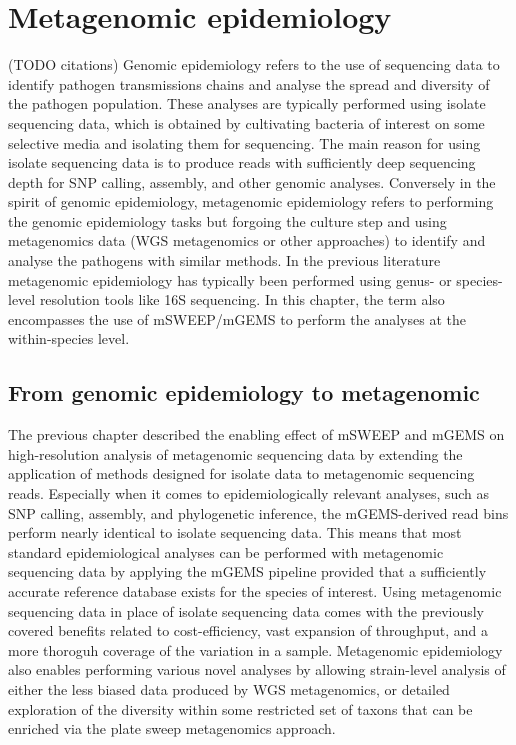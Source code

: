 \documentclass[officiallayout]{tktla}
\begin{document}
\chapter{Metagenomic epidemiology}
\label{section:metagenomic-epidemiology}

(TODO citations) Genomic epidemiology refers to the use of sequencing
data to identify pathogen transmissions chains and analyse the spread
and diversity of the pathogen population. These analyses are typically
performed using isolate sequencing data, which is obtained by
cultivating bacteria of interest on some selective media and isolating
them for sequencing. The main reason for using isolate sequencing data
is to produce reads with sufficiently deep sequencing depth for SNP
calling, assembly, and other genomic analyses. Conversely in the
spirit of genomic epidemiology, metagenomic epidemiology refers to
performing the genomic epidemiology tasks but forgoing the culture
step and using metagenomics data (WGS metagenomics or other
approaches) to identify and analyse the pathogens with similar
methods. In the previous literature metagenomic epidemiology has
typically been performed using genus- or species-level resolution
tools like 16S sequencing. In this chapter, the term also encompasses
the use of mSWEEP/mGEMS to perform the analyses at the within-species
level.

\section{From genomic epidemiology to metagenomic}

The previous chapter described the enabling effect of mSWEEP and mGEMS
on high-resolution analysis of metagenomic sequencing data by
extending the application of methods designed for isolate data to
metagenomic sequencing reads. Especially when it comes to
epidemiologically relevant analyses, such as SNP calling, assembly,
and phylogenetic inference, the mGEMS-derived read bins perform nearly
identical to isolate sequencing data. This means that most standard
epidemiological analyses can be performed with metagenomic sequencing
data by applying the mGEMS pipeline \textemdash{ } provided that a
sufficiently accurate reference database exists for the species of
interest. Using metagenomic sequencing data in place of isolate
sequencing data comes with the previously covered benefits related to
cost-efficiency, vast expansion of throughput, and a more thoroguh
coverage of the variation in a sample. Metagenomic epidemiology also
enables performing various novel analyses by allowing strain-level
analysis of either the less biased data produced by WGS metagenomics,
or detailed exploration of the diversity within some restricted set of
taxons that can be enriched via the plate sweep metagenomics approach.
\end{document}

